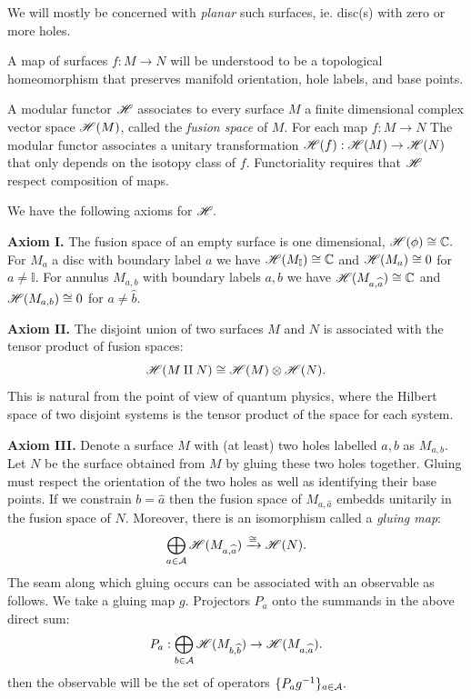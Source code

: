 \documentclass[aps, prl, letterpaper, twocolumn, superscriptaddress, notitlepage, 10pt]{revtex4-1}
\newcommand{\vac}{\mathbb{I}}
\begin{document}
We will mostly be concerned with \emph{planar} such
surfaces, ie. disc(s) with zero or more holes.

A map of surfaces $f:M\to N$ will be understood to be
a topological homeomorphism that preserves
manifold orientation, hole labels, and base points.

A modular functor $\mathscr{H}$ associates to every
surface $M$ a finite dimensional complex
vector space $\mathscr{H}(M)$, called the \emph{fusion space} of $M$.
For each map $f:M\to N$
The modular functor associates a
unitary transformation $\mathscr{H}(f) : \mathscr{H}(M)\to\mathscr{H}(N)$
that only depends on the isotopy class of $f.$
Functoriality requires that $\mathscr{H}$
respect composition of maps.

We have the following axioms for $\mathscr{H}.$

{\bf Axiom I.}
The fusion space of an empty surface is one dimensional, 
$\mathscr{H}(\phi) \cong \mathbb{C}.$
For $M_a$ a disc with boundary label $a$ we have
$\F(M_\vac)\cong \C$ and 
$\mathscr{H}(M_a)\cong 0$ for $a\ne \vac.$
For annulus $M_{a,b}$ with boundary labels
$a, b$ we have
$\mathscr{H}(M_{a,\widehat{a}})\cong \mathbb{C}$ and 
$\mathscr{H}(M_{a,b})\cong 0$ for $a\ne \widehat{b}.$

{\bf Axiom II.}
The disjoint union of two surfaces $M$ and $N$ 
is associated with
the tensor product of fusion spaces:
$$
    \mathscr{H}(M\amalg N) \cong \mathscr{H}(M)\otimes \mathscr{H}(N).
$$
This is natural from the point of view of quantum
physics, where the Hilbert space of two disjoint
systems is the tensor product of the space for
each system.

{\bf Axiom III.}
Denote a surface $M$ with (at least) two holes
labelled $a, b$ as $M_{a,b}$. 
Let $N$ be the surface obtained from $M$ by gluing
these two holes together.
Gluing must respect the orientation of the two holes
as well as identifying their base points.
If we constrain $b=\widehat{a}$ then the fusion space
of $M_{a,\widehat{a}}$ embedds unitarily in the fusion
space of $N.$ Moreover, there is an isomorphism called
a \emph{gluing map}:
$$
    \bigoplus_{a\in\mathcal{A}} \mathscr{H}(M_{a,\widehat{a}}) \xrightarrow{\cong} \mathscr{H}(N).
$$
The seam along which gluing occurs can be associated
with an observable as follows.
We take a gluing map $g$. Projectors $P_a$ onto the
summands in the above direct sum:
$$
    P_a: \bigoplus_{b\in\mathcal{A}} \mathscr{H}(M_{b,\widehat{b}}) \to \mathscr{H}(M_{a,\widehat{a}}).
$$
then the observable will be the set of operators $\{P_a g^{-1}\}_{a\in\mathcal{A}}.$
\end{document}
